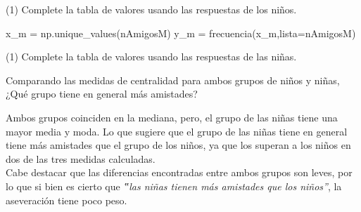 \documentclass[sin nombre]{plantilla-evaluacion-v1}
\begin{document}
\begin{preguntas}(1)
  \pregunta Complete la tabla de valores usando las respuestas de los niños.
  \begin{malla}[height=3cm]
  \end{malla}
  \usebox{\tabla}
\end{preguntas}%
%
\begin{python}
  x_m = np.unique_values(nAmigosM)
  y_m = frecuencia(x_m,lista=nAmigosM)
\end{python}%
%
\begin{center}
\end{center}

\begin{preguntas}[after-item-skip=20pt](1)
  \pregunta Complete la tabla de valores usando las respuestas de las niñas.\\[5pt]
  \begin{malla}[height=3cm]
  \end{malla}
  \usebox{\tabla}

  \pregunta Comparando las medidas de centralidad para ambos grupos de niños y niñas,
  ¿Qué grupo tiene en general más amistades?
  \begin{respuesta}[height=5cm]
  \end{respuesta}
\end{preguntas}

\newpage
\respuestas
\begin{preguntas}[resume=false,after-item-skip=15pt]
  \pregunta {}
  \pregunta {}
  \pregunta {}
  \pregunta {}
  \pregunta {}
  \pregunta {}
  \pregunta Ambos grupos coinciden en la mediana, pero, el grupo
  de las niñas tiene una mayor media y moda. Lo que sugiere que el grupo de las
  niñas tiene en general tiene más amistades que el grupo de los niños, ya que los
  superan a los niños en dos de las tres medidas calculadas.\\[6pt]
  Cabe destacar que las diferencias encontradas entre ambos grupos son leves, por lo que si
  bien es cierto que \textit{‟las niñas tienen más amistades que los niños”}, la aseveración tiene
  poco peso.
\end{preguntas}
\end{document}
